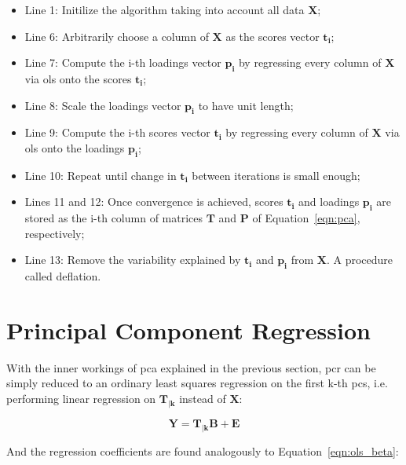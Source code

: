 \begin{itemize}
	\item Line 1: Initilize the algorithm taking into account all data $\mathbf{X}$;
	
	\item Line 6: Arbitrarily choose a column of $\mathbf{X}$ as the scores vector $\mathbf{t_i}$;
	
	\item Line 7: Compute the i-th loadings vector $\mathbf{p_i}$ by regressing every column of $\mathbf{X}$ via \acrshort{ols} onto the scores $\mathbf{t_i}$;
	
	\item Line 8: Scale the loadings vector $\mathbf{p_i}$ to have unit length;
	
	\item Line 9: Compute the i-th scores vector $\mathbf{t_i}$ by regressing every column of $\mathbf{X}$ via \acrshort{ols} onto the loadings $\mathbf{p_i}$;
	
	\item Line 10: Repeat until change in $\mathbf{t_i}$ between iterations is small enough;
	
	\item Lines 11 and 12: Once convergence is achieved, scores $\mathbf{t_i}$ and loadings $\mathbf{p_i}$ are stored as the i-th column of matrices $\mathbf{T}$ and $\mathbf{P}$ of Equation~\ref{eqn:pca}, respectively;
	
	\item Line 13: Remove the variability explained by $\mathbf{t_i}$ and $\mathbf{p_i}$ from $\mathbf{X}$. A procedure called deflation.
\end{itemize}

\section{Principal Component Regression}
\label{sec:pcr}

With the inner workings of \acrshort{pca} explained in the previous section, \acrshort{pcr} can be simply reduced to an ordinary least squares regression on the first k-th \acrshort{pc}s, i.e. performing linear regression on $\mathbf{T_{|k}}$ instead of $\mathbf{X}$:
	
	\begin{equation}
		\label{eqn:pcr}
		\mathbf{Y = T_{|k} B + E}
	\end{equation}

And the regression coefficients are found analogously to Equation~\ref{eqn:ols_beta}:


